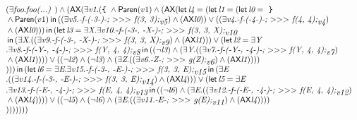 \documentclass{article}
\newcommand{\AX}{\mbox{\sf{AX}}}
\newcommand{\mita}[1]{\mbox{\it{{#1}}}}
\newcommand{\msf}[1]{\mbox{\sf{{#1}}}}
\newcommand{\mth}[1]{\({#1}\)}
\newcommand{\ttlb}{\mbox{\tt \char'173}}
\newcommand{\ttrb}{\mbox{\tt \char'175}}
\begin{document}
\[\begin{array}{l}
(\exists \mita{foo} . \mita{foo(...) }) \wedge (\AX(\exists \mita{v1} . (\mita{{\ttlb}
  } \wedge \msf{Paren}(v1) \wedge (\AX(\mita{\sf{let}} \, \mita{l4} = (\mita{\sf{let}} \, \mita{l1} = (\mita{\sf{let}} \, \mita{l0} = \mita{
{\ttrb}}\\\mbox{} \wedge \msf{Paren}(v1) \, \mita{\sf{in}} \, ((\exists \mita{v5} . \mita{-f-(-3-)-;
  \mth{>}\mth{>}\mth{>} f(3, 3);}_{\mita{v5}}) \wedge (\AX\mita{l0})) \vee ((\exists \mita{v4} . \mita{-f-(-4-)-;
  \mth{>}\mth{>}\mth{>} f(4, 4);}_{\mita{v4}})\\\mbox{} \wedge (\AX\mita{l0}))
) \, \mita{\sf{in}} \, (\mita{\sf{let}} \, \mita{l3} = \exists \mita{X} . \exists \mita{v10} . \mita{-f-(-3-, -X-)-;
  \mth{>}\mth{>}\mth{>} f(3, 3, X);}_{\mita{v10}}\\\mbox{} \, \mita{\sf{in}} \, (\exists \mita{X} . ((\exists \mita{v9} . \mita{-f-(-3-, -X-)-;
  \mth{>}\mth{>}\mth{>} f(3, 3, X);}_{\mita{v9}}) \wedge (\AX\mita{l1}))) \vee (\mita{\sf{let}} \, \mita{l2} = \exists \mita{Y}\\\mbox{} . \exists \mita{v8} . \mita{-f-(-Y-, -4-)-;
  \mth{>}\mth{>}\mth{>} f(Y, 4, 4);}_{\mita{v8}} \, \mita{\sf{in}} \, ((\neg \mita{l3}) \wedge (\exists \mita{Y} . ((\exists \mita{v7} . \mita{-f-(-Y-, -4-)-;
  \mth{>}\mth{>}\mth{>} f(Y, 4, 4);}_{\mita{v7}})\\\mbox{} \wedge (\AX\mita{l1})))) \vee ((\neg \mita{l2}) \wedge (\neg \mita{l3}) \wedge (\exists \mita{Z} . ((\exists \mita{v6} . \mita{-Z-;
  \mth{>}\mth{>}\mth{>} g(Z);}_{\mita{v6}}) \wedge (\AX\mita{l1}))))\\\mbox{}
)
)
) \, \mita{\sf{in}} \, (\mita{\sf{let}} \, \mita{l6} = \exists \mita{E} . \exists \mita{v15} . \mita{-f-(-3-, -E-)-;
  \mth{>}\mth{>}\mth{>} f(3, 3, E);}_{\mita{v15}} \, \mita{\sf{in}} \, (\exists \mita{E}\\\mbox{} . ((\exists \mita{v14} . \mita{-f-(-3-, -E-)-;
  \mth{>}\mth{>}\mth{>} f(3, 3, E);}_{\mita{v14}}) \wedge (\AX\mita{l4}))) \vee (\mita{\sf{let}} \, \mita{l5} = \exists \mita{E}\\\mbox{} . \exists \mita{v13} . \mita{-f-(-E-, -4-)-;
  \mth{>}\mth{>}\mth{>} f(E, 4, 4);}_{\mita{v13}} \, \mita{\sf{in}} \, ((\neg \mita{l6}) \wedge (\exists \mita{E} . ((\exists \mita{v12} . \mita{-f-(-E-, -4-)-;
  \mth{>}\mth{>}\mth{>} f(E, 4, 4);}_{\mita{v12}})\\\mbox{} \wedge (\AX\mita{l4})))) \vee ((\neg \mita{l5}) \wedge (\neg \mita{l6}) \wedge (\exists \mita{E} . ((\exists \mita{v11} . \mita{-E-;
  \mth{>}\mth{>}\mth{>} g(E);}_{\mita{v11}}) \wedge (\AX\mita{l4}))))\\\mbox{}
)
)
)))))
\end{array}\]
\end{document}
